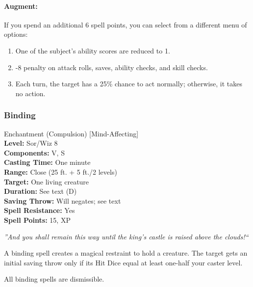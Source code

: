 \paragraph{Augment:} If you spend an additional 6 spell points, you can select from a different menu of options:
\begin{enumerate}
 \item One of the subject's ability scores are reduced to 1.
 \item -8 penalty on attack rolls, saves, ability checks, and skill checks.
 \item Each turn, the target has a 25\% chance to act normally; otherwise, it takes no action.
\end{enumerate}
\subsubsection{Binding}
\label{Spell:Binding}
Enchantment (Compulsion) [Mind-Affecting]
\\ \textbf{Level:} Sor/Wiz 8 
\\ \textbf{Components:} V, S 
\\ \textbf{Casting Time:} One minute 
\\ \textbf{Range:} Close (25 ft. + 5 ft./2 levels)
\\ \textbf{Target:} One living creature 
\\ \textbf{Duration:} See text (D)
\\ \textbf{Saving Throw:} Will negates; see text
\\ \textbf{Spell Resistance:} Yes
\\ \textbf{Spell Points:} 15, XP

\emph{''And you shall remain this way until the king's castle is raised above the clouds!``}

A binding spell creates a magical restraint to hold a creature. 
The target gets an initial saving throw only if its Hit Dice equal at least one-half your caster level.

All binding spells are dismissible.

